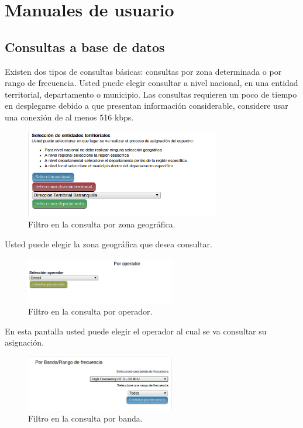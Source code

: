 \section*{Manuales de usuario} \label{sec:ManualesdeUsuario}

\begin{multicols}{2} 
\subsection*{Consultas a base de datos}

Existen dos tipos de consultas básicas: consultas por zona determinada o por rango de frecuencia. Usted puede elegir consultar a nivel nacional, en una entidad territorial, departamento o municipio. Las consultas requieren un poco de tiempo en desplegarse debido a que presentan información considerable, considere usar una conexión de al menos 516 kbps.

\begin{figure}[H]
	\centering
	\includegraphics[width=8.5cm]{Anexos/Imagenes/ManualUsuario/ConsultasGeografica.png}
	\caption{Filtro en la consulta por zona geográfica.}
\end{figure}

Usted puede elegir la zona geográfica que desea consultar.
	
\begin{figure}[H]
	\centering
	\includegraphics[width=6.5cm]{Anexos/Imagenes/ManualUsuario/FiltroPorOperador.png}
	\caption{Filtro en la consulta por operador.}
\end{figure}

En esta pantalla usted puede elegir el operador al cual se va consultar su asignación.

\begin{figure}[H]
	\centering
	\includegraphics[width=6.5cm]{Anexos/Imagenes/ManualUsuario/FiltroPorBanda.png}
	\caption{Filtro en la consulta por banda.}
\end{figure}


\end{multicols}

